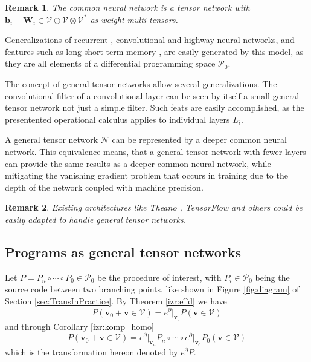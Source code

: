\documentclass[smallcondensed]{svjour3}
\newcommand{\bfW}{\mathbf{W}}
\newcommand{\VV}{\mathcal{V}}
\newcommand{\NN}{\mathcal{N}}
\newcommand{\vv}{\mathbf{v}}
\newcommand{\dP}{\mathcal{P}}
\newcommand{\D}{\partial}
\newtheorem{opomba}{Remark}[section]
\begin{document}
\begin{opomba}
  The common neural network is a tensor network with $\mathbf{b}_i+\bfW_i\in
  \VV\oplus \VV\otimes \VV^*$ as weight multi-tensors.
\end{opomba}

Generalizations of recurrent \cite{RecurrentNet}, convolutional \cite{ConvNet} and highway  \cite{HighwayNet} neural networks, and features such as long short term memory \cite{LSTM}, are easily generated by this model, as they are all elements of a differential programming space $\dP_0$.

The concept of general tensor networks allow several generalizations. The
convolutional filter of a convolutional layer can be seen by itself a small general
tensor network  not just a simple filter. Such feats are easily accomplished, as
the presentented operational calculus applies to individual layers $L_i$.  
 
A general tensor network $\NN$ can be represented by a deeper
common neural network. This equivalence means, that a general tensor network
with fewer layers can provide the same results as a deeper common neural
network, while mitigating the vanishing gradient problem
\cite{VanishingGradient} that occurs in training due to the depth of the network
coupled with machine precision. 

\begin{opomba}
Existing architectures like Theano \cite{Theano}, TensorFlow \cite{TensorFlow}
and others could be easily adapted to handle general tensor networks.
\end{opomba}

\subsection{Programs as general tensor networks}\label{sec:progAsNet}

Let $P=P_n\circ\cdots\circ P_0\in\dP_0$ be the procedure of interest, with $P_i\in\dP_0$ being the source code between two branching points, like shown in Figure \ref{fig:diagram} of Section \ref{sec:TransInPractice}.
By Theorem \ref{izr:e^d} we have
\begin{equation}\label{eq:PGN1}
P(\vv_0+\vv\in \VV)=e^\D\vert_{\vv_0} P(\vv\in \VV)
\end{equation}
and through Corollary \ref{izr:komp_homo}
\begin{equation}\label{eq:eDkompo}
P(\vv_0+\vv\in \VV)=e^\D\vert_{\vv_n} P_n\circ\cdots \circ e^\D\vert_{\vv_0} P_0(\vv\in \VV)
\end{equation}
which is the transformation hereon denoted by $e^\D P$.
\end{document}
